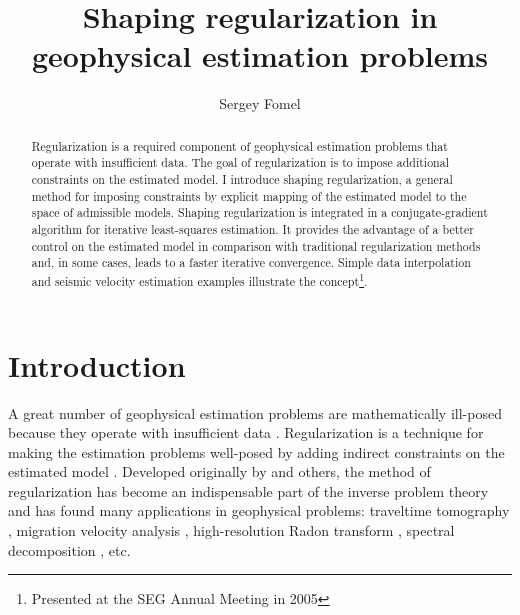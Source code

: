 \title{Shaping regularization in geophysical estimation problems}



\author{Sergey Fomel}

\address{Bureau of Economic Geology, \\
John A. and Katherine G. Jackson School of Geosciences \\
The University of Texas at Austin \\
University Station, Box X \\
Austin, TX 78713-8972}

\maketitle

\begin{abstract}
  Regularization is a required component of geophysical estimation
  problems that operate with insufficient data. The goal of
  regularization is to impose additional constraints on the estimated
  model. I introduce shaping regularization, a general method for
  imposing constraints by explicit mapping of the estimated model to
  the space of admissible models. Shaping regularization is integrated
  in a conjugate-gradient algorithm for iterative least-squares
  estimation. It provides the advantage of a better control on the
  estimated model in comparison with traditional regularization
  methods and, in some cases, leads to a faster iterative
  convergence. Simple data interpolation and seismic velocity
  estimation examples illustrate the concept\footnote{Presented at the SEG Annual Meeting in 2005}.
\end{abstract}

\section{Introduction}
A great number of geophysical estimation problems are mathematically
ill-posed because they operate with insufficient data
\cite[]{jackson}. Regularization is a technique for making the
estimation problems well-posed by adding indirect constraints on the
estimated model \cite[]{engl,zhdanov}. Developed originally by
\cite{tikhonov} and others, the method of regularization has become an
indispensable part of the inverse problem theory and has found many
applications in geophysical problems: traveltime tomography
\cite[]{SEG-1999-12951298,clapp}, migration velocity analysis
\cite[]{SEG-1998-1218,SEG-2003-06660669}, high-resolution Radon
transform \cite[]{GEO68-01-03860399}, spectral decomposition
\cite[]{port}, etc.

